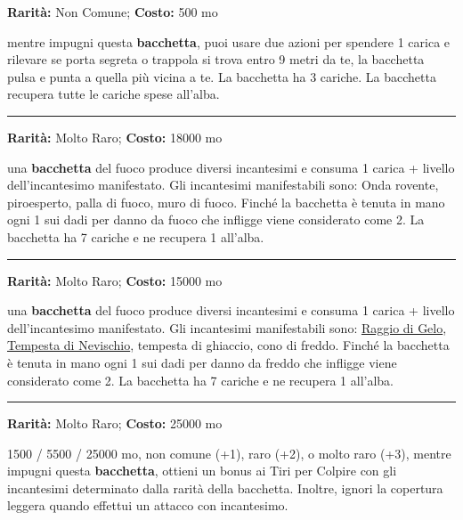 \begin{multicols}{2}
\textbf{Rarità:} Non Comune; \textbf{Costo:} 500 mo

mentre impugni questa \textbf{bacchetta}, puoi usare due azioni per spendere 1 carica e rilevare se porta segreta o trappola si trova entro 9 metri da te, la bacchetta pulsa e punta a quella più vicina a te. La bacchetta ha 3 cariche. La bacchetta recupera tutte le cariche spese all'alba.

\smallskip\noindent\rule{\linewidth}{2pt}  \hypertarget{BacchettadelFuoco}{}\smallskip{}\noindent\label{BacchettadelFuoco}

\textbf{Rarità:} Molto Raro; \textbf{Costo:} 18000 mo

una \textbf{bacchetta} del fuoco produce diversi incantesimi e consuma 1 carica + livello dell'incantesimo manifestato. Gli incantesimi manifestabili sono: Onda rovente, piroesperto, palla di fuoco, muro di fuoco. Finché la bacchetta è tenuta in mano ogni 1 sui dadi per danno da fuoco che infligge viene considerato come 2. La bacchetta ha 7 cariche e ne recupera 1 all'alba.

\smallskip\noindent\rule{\linewidth}{2pt}  \hypertarget{BacchettadelGhiaccio}{}\smallskip{}\noindent\label{BacchettadelGhiaccio}

\textbf{Rarità:} Molto Raro; \textbf{Costo:} 15000 mo

una \textbf{bacchetta} del fuoco produce diversi incantesimi e consuma 1 carica + livello dell'incantesimo manifestato. Gli incantesimi manifestabili sono: \hyperlink{Raggio di Gelo}{Raggio di Gelo}, \hyperlink{Tempesta di Nevischio}{Tempesta di Nevischio}, tempesta di ghiaccio, cono di freddo. Finché la bacchetta è tenuta in mano ogni 1 sui dadi per danno da freddo che infligge viene considerato come 2. La bacchetta ha 7 cariche e ne recupera 1 all'alba.

\smallskip\noindent\rule{\linewidth}{2pt}  \hypertarget{BacchettadelMagodaGuerra}{}\smallskip{}\noindent\label{BacchettadelMagodaGuerra}

\textbf{Rarità:} Molto Raro; \textbf{Costo:} 25000 mo

1500 / 5500 / 25000 mo, non comune (+1), raro (+2), o molto raro (+3), mentre impugni questa \textbf{bacchetta}, ottieni un bonus ai Tiri per Colpire con gli incantesimi determinato dalla rarità della bacchetta. Inoltre, ignori la copertura leggera quando effettui un attacco con incantesimo.


\end{multicols}
